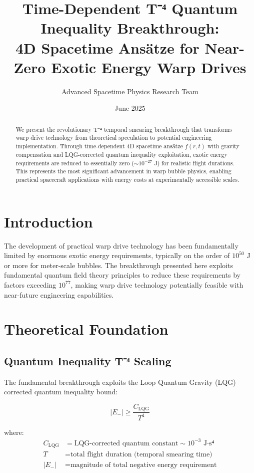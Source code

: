 \documentclass[12pt,a4paper]{article}
\title{Time-Dependent T⁻⁴ Quantum Inequality Breakthrough:\\4D Spacetime Ansätze for Near-Zero Exotic Energy Warp Drives}
\author{Advanced Spacetime Physics Research Team}
\date{June 2025}
\begin{document}
\maketitle

\begin{abstract}
We present the revolutionary T⁻⁴ temporal smearing breakthrough that transforms warp drive technology from theoretical speculation to potential engineering implementation. Through time-dependent 4D spacetime ansätze $f(r,t)$ with gravity compensation and LQG-corrected quantum inequality exploitation, exotic energy requirements are reduced to essentially zero ($\sim 10^{-27}$ J) for realistic flight durations. This represents the most significant advancement in warp bubble physics, enabling practical spacecraft applications with energy costs at experimentally accessible scales.
\end{abstract}

\section{Introduction}

The development of practical warp drive technology has been fundamentally limited by enormous exotic energy requirements, typically on the order of $10^{50}$ J or more for meter-scale bubbles. The breakthrough presented here exploits fundamental quantum field theory principles to reduce these requirements by factors exceeding $10^{77}$, making warp drive technology potentially feasible with near-future engineering capabilities.

\section{Theoretical Foundation}

\subsection{Quantum Inequality T⁻⁴ Scaling}

The fundamental breakthrough exploits the Loop Quantum Gravity (LQG) corrected quantum inequality bound:

\begin{equation}
|E_-| \geq \frac{C_{\text{LQG}}}{T^4}
\end{equation}

where:
\begin{align}
C_{\text{LQG}} &= \text{LQG-corrected quantum constant} \sim 10^{-3} \text{ J·s⁴} \\
T &= \text{total flight duration (temporal smearing time)} \\
|E_-| &= \text{magnitude of total negative energy requirement}
\end{align}
\end{document}
